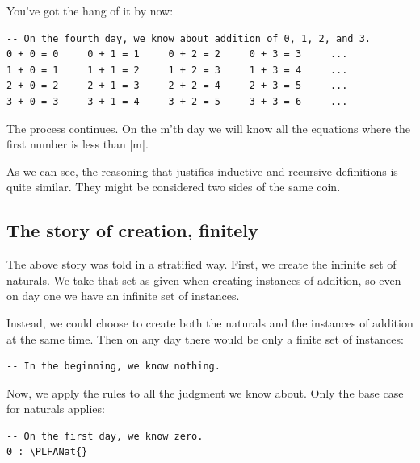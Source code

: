 \documentclass{memoir}
\newcommand{\PLFANat}{\ensuremath{\mathbb{N}}}
\begin{document}
\par
You've got the hang of it by now:

\par
\begin{verbatim}
-- On the fourth day, we know about addition of 0, 1, 2, and 3.
0 + 0 = 0     0 + 1 = 1     0 + 2 = 2     0 + 3 = 3     ...
1 + 0 = 1     1 + 1 = 2     1 + 2 = 3     1 + 3 = 4     ...
2 + 0 = 2     2 + 1 = 3     2 + 2 = 4     2 + 3 = 5     ...
3 + 0 = 3     3 + 1 = 4     3 + 2 = 5     3 + 3 = 6     ...
\end{verbatim}

\par
The process continues. On the m'th day we will know all the equations where the
first number is less than \LeanVerb|m|.

\par
As we can see, the reasoning that justifies inductive and recursive definitions
is quite similar. They might be considered two sides of the same coin.

\par

\subsection{The story of creation, finitely}\label{PLFA--in--Lean----Part--1----Naturals----The--story--of--creation-005F-005F-005F--finitely}

\par
The above story was told in a stratified way. First, we create the infinite set
of naturals. We take that set as given when creating instances of addition, so
even on day one we have an infinite set of instances.

\par
Instead, we could choose to create both the naturals and the instances of
addition at the same time. Then on any day there would be only a finite set of
instances:

\par
\begin{verbatim}
-- In the beginning, we know nothing.
\end{verbatim}

\par
Now, we apply the rules to all the judgment we know about. Only the base case
for naturals applies:

\par
\begin{verbatim}
-- On the first day, we know zero.
0 : \PLFANat{}
\end{verbatim}
\end{document}
